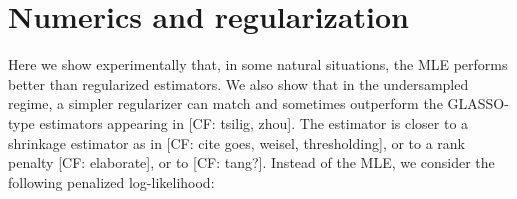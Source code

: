 \documentclass[aos]{imsart}
\theoremstyle{definition}
\numberwithin{equation}{section}
\newcommand{\E}{\mathbb{E}}
\newcommand{\CF}[1]{{\color{purple}[CF: #1]}}
\begin{document}




\section{Numerics and regularization}\label{sec:numerics}
Here we show experimentally that, in some natural situations, the MLE performs better than regularized estimators. We also show that in the undersampled regime, a simpler regularizer can match and sometimes outperform the GLASSO-type estimators appearing in \CF{tsilig, zhou}. The estimator is closer to a shrinkage estimator as in \CF{cite goes, weisel, thresholding}, or to a rank penalty \CF{elaborate}, or to \CF{tang?}. Instead of the MLE, we consider the following penalized log-likelihood:
\end{document}
